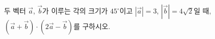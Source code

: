 두 벡터 $\vec{a}$, $\vec{b}$가 이루는 각의 크기가 $45^\circ$이고 $|\vec{a}|=3$, $|\vec{b}|=4\sqrt{2}$일 때, $(\vec{a}+\vec{b})\cdot(2\vec{a}-\vec{b})$를 구하시오.
